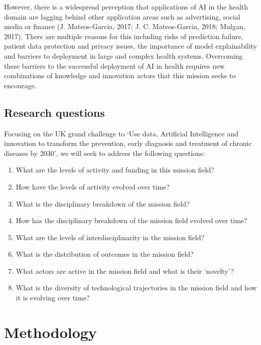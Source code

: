 \documentclass[11pt]{article}
\begin{document}
However, there is a widespread perception that applications of AI in the health domain are lagging behind other application areas such as advertising, social media or finance (J. Mateos-Garcia, 2017; J. C. Mateos-Garcia, 2018; Mulgan, 2017). There are multiple reasons for this including risks of prediction failure, patient data protection and privacy issues, the importance of model explainability and barriers to deployment in large and complex health systems. Overcoming these barriers to the successful deployment of AI in health requires new combinations of knowledge and innovation actors that this mission seeks to encourage.

\subsection{Research questions}
\label{subsec: questions}

Focusing on the UK grand challenge to `Use data, Artificial Intelligence and innovation to transform the prevention, early diagnosis and treatment of chronic diseases by 2030', we will seek to address the following questions:

\begin{enumerate}
    \item What are the levels of activity and funding in this mission field?
    \item How have the levels of activity evolved over time?
    \item What is the disciplinary breakdown of the mission field?
    \item How has the disciplinary breakdown of the mission field evolved over time?
    \item What are the levels of interdisciplinarity in the mission field?
    \item What is the distribution of outcomes in the mission field?
    \item What actors are active in the mission field and what is their `novelty’?
    \item What is the diversity of technological trajectories in the mission field and how it is evolving over time?

\end{enumerate}

\section{Methodology}
\label{sec:methodology}
\end{document}
